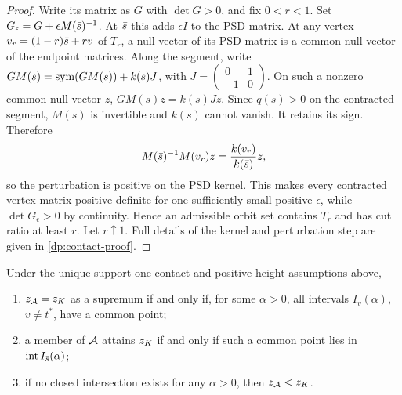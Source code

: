 \begin{proof}
Write its matrix as $G$ with $\det G>0$, and fix $0<r<1$. Set
$G_\epsilon=G+\epsilon M(\bar s)^{-1}$. At $\bar s$ this adds $\epsilon I$
to the PSD matrix. At any vertex $v_r=(1-r)\bar s+rv$ of $T_r$, a null
vector of its PSD matrix is a common null vector of the endpoint matrices.
Along the segment, write $GM(s)=\operatorname{sym}(GM(s))+k(s)J$, with
$J=\left(\begin{smallmatrix}0&1\\-1&0\end{smallmatrix}\right)$.
On such a nonzero common null vector $z$,
$GM(s)z=k(s)Jz$. Since $q(s)>0$ on the contracted segment, $M(s)$ is
invertible and $k(s)$ cannot vanish. It retains its sign. Therefore
\[
 M(\bar s)^{-1}M(v_r)z=\frac{k(v_r)}{k(\bar s)}z,
\]
so the perturbation is positive on the PSD kernel. This makes every
contracted vertex matrix positive definite for one sufficiently small
positive $\epsilon$, while $\det G_\epsilon>0$ by continuity.
Hence an admissible orbit set contains $T_r$ and has cut ratio at least $r$.
Let $r\uparrow1$. Full details of the kernel and perturbation step are
given in \cref{dp:contact-proof}.
\end{proof}

\begin{theorem}\label{dp:contact-intervals}
Under the unique support-one contact and positive-height assumptions above,
\begin{enumerate}
 \item $z_{\mathcal A}=z_K$ as a supremum if and only if, for some $\alpha>0$,
       all intervals $I_v(\alpha)$, $v\ne t^*$, have a common point;
 \item a member of $\mathcal A$ attains $z_K$ if and only if such a common point
       lies in $\operatorname{int} I_{\bar s}(\alpha)$;
 \item if no closed intersection exists for any $\alpha>0$, then
       $z_{\mathcal A}<z_K$.
\end{enumerate}
\end{theorem}

